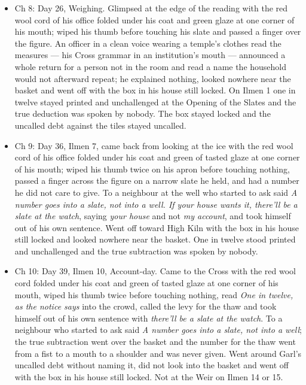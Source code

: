 \documentclass{design/chronicle}
\begin{document}
{\begin{itemize}[leftmargin=1.4em,itemsep=1pt,topsep=3pt,parsep=0pt]
\item Ch 8: Day 26, Weighing. Glimpsed at the edge of the reading with the red wool cord of his office folded under his coat and green glaze at one corner of his mouth; wiped his thumb before touching his slate and passed a finger over the figure. An officer in a clean voice wearing a temple’s clothes read the measures --- his Cross grammar in an institution’s mouth --- announced a whole return for a person not in the room and read a name the household would not afterward repeat; he explained nothing, looked nowhere near the basket and went off with the box in his house still locked. On Ilmen 1 one in twelve stayed printed and unchallenged at the Opening of the Slates and the true deduction was spoken by nobody. The box stayed locked and the uncalled debt against the tiles stayed uncalled.

\end{itemize}

\begin{itemize}[leftmargin=1.4em,itemsep=1pt,topsep=3pt,parsep=0pt]

\item Ch 9: Day 36, Ilmen 7, came back from looking at the ice with the red wool cord of his office folded under his coat and green of tasted glaze at one corner of his mouth; wiped his thumb twice on his apron before touching nothing, passed a finger across the figure on a narrow slate he held, and had a number he did not care to give. To a neighbour at the well who started to ask said \emph{A number goes into a slate, not into a well. If your house wants it, there’ll be a slate at the watch}, saying \emph{your house} and not \emph{my account}, and took himself out of his own sentence. Went off toward High Kiln with the box in his house still locked and looked nowhere near the basket. One in twelve stood printed and unchallenged and the true subtraction was spoken by nobody.

\end{itemize}

\begin{itemize}[leftmargin=1.4em,itemsep=1pt,topsep=3pt,parsep=0pt]

\item Ch 10: Day 39, Ilmen 10, Account-day. Came to the Cross with the red wool cord folded under his coat and green of tasted glaze at one corner of his mouth, wiped his thumb twice before touching nothing, read \emph{One in twelve, as the notice says} into the crowd, called the levy for the thaw and took himself out of his own sentence with \emph{there’ll be a slate at the watch}. To a neighbour who started to ask said \emph{A number goes into a slate, not into a well}; the true subtraction went over the basket and the number for the thaw went from a fist to a mouth to a shoulder and was never given. Went around Garl’s uncalled debt without naming it, did not look into the basket and went off with the box in his house still locked. Not at the Weir on Ilmen 14 or 15.

\end{itemize}
}
\end{document}
